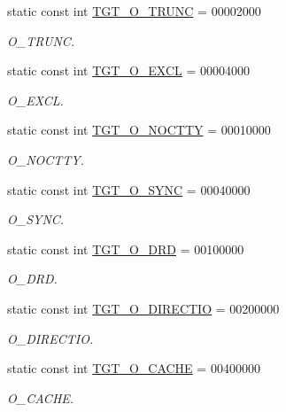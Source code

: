 \begin{Indent}{\bf }
\begin{DoxyCompactItemize}
static const int \hyperlink{classAlphaTru64_a4f892ee6e1424a2becd859b0bef1f18b}{TGT\_\-O\_\-TRUNC} = 00002000
\begin{DoxyCompactList}\small\item\em O\_\-TRUNC. \item\end{DoxyCompactList}\item 
static const int \hyperlink{classAlphaTru64_a10d5d118d15b51ebdd4b16dc78342d1d}{TGT\_\-O\_\-EXCL} = 00004000
\begin{DoxyCompactList}\small\item\em O\_\-EXCL. \item\end{DoxyCompactList}\item 
static const int \hyperlink{classAlphaTru64_adfd4240281579e5f60c5e22c601225d8}{TGT\_\-O\_\-NOCTTY} = 00010000
\begin{DoxyCompactList}\small\item\em O\_\-NOCTTY. \item\end{DoxyCompactList}\item 
static const int \hyperlink{classAlphaTru64_abf43ab05d2a5b6b8113952160d8565db}{TGT\_\-O\_\-SYNC} = 00040000
\begin{DoxyCompactList}\small\item\em O\_\-SYNC. \item\end{DoxyCompactList}\item 
static const int \hyperlink{classAlphaTru64_a83feaef06c27596d44d489ec51e197fd}{TGT\_\-O\_\-DRD} = 00100000
\begin{DoxyCompactList}\small\item\em O\_\-DRD. \item\end{DoxyCompactList}\item 
static const int \hyperlink{classAlphaTru64_a0a80dc00bd46d433f1ff0d38da2f5ded}{TGT\_\-O\_\-DIRECTIO} = 00200000
\begin{DoxyCompactList}\small\item\em O\_\-DIRECTIO. \item\end{DoxyCompactList}\item 
static const int \hyperlink{classAlphaTru64_ab30a547e309825ec5f9c5d11a6da543c}{TGT\_\-O\_\-CACHE} = 00400000
\begin{DoxyCompactList}\small\item\em O\_\-CACHE. \item\end{DoxyCompactList}\item 

\end{DoxyCompactItemize}
\end{Indent}
